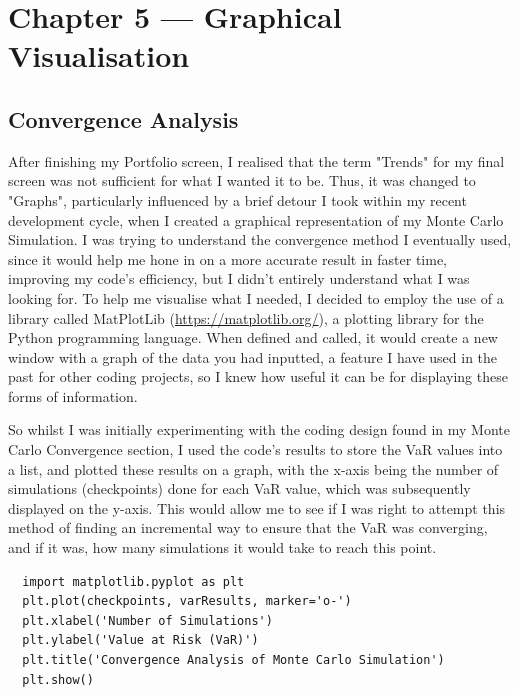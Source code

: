 \documentclass{article}
\begin{document}
\newpage
\section{Chapter 5 --- Graphical Visualisation}

\subsection{Convergence Analysis}
After finishing my Portfolio screen, I realised that the term "Trends" for my final screen was not sufficient for what I wanted it to be. Thus, it was changed to "Graphs", particularly influenced by a brief detour I took within my recent development cycle, when I created a graphical representation of my Monte Carlo Simulation. I was trying to understand the convergence method I eventually used, since it would help me hone in on a more accurate result in faster time, improving my code's efficiency, but I didn't entirely understand what I was looking for. To help me visualise what I needed, I decided to employ the use of a library called MatPlotLib (\url{https://matplotlib.org/}), a plotting library for the Python programming language. When defined and called, it would create a new window with a graph of the data you had inputted, a feature I have used in the past for other coding projects, so I knew how useful it can be for displaying these forms of information.\\\vspace{0.3cm}

So whilst I was initially experimenting with the coding design found in my Monte Carlo Convergence section, I used the code's results to store the VaR values into a list, and plotted these results on a graph, with the x-axis being the number of simulations (checkpoints) done for each VaR value, which was subsequently displayed on the y-axis. This would allow me to see if I was right to attempt this method of finding an incremental way to ensure that the VaR was converging, and if it was, how many simulations it would take to reach this point.\\\vspace{0.3cm}

\begin{verbatim}
  import matplotlib.pyplot as plt
  plt.plot(checkpoints, varResults, marker='o-')
  plt.xlabel('Number of Simulations')
  plt.ylabel('Value at Risk (VaR)')
  plt.title('Convergence Analysis of Monte Carlo Simulation')
  plt.show()
\end{verbatim}
\end{document}
